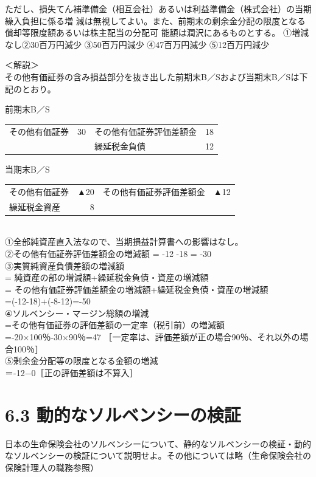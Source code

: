 \documentclass[report,gutter=10mm,fore-edge=10mm,uplatex,dvipdfmx]{jlreq}
\begin{document}
ただし、損失てん補準備金（相互会社）あるいは利益準備金（株式会社）の当期繰入負担に係る増
減は無視してよい。また、前期末の剰余金分配の限度となる償却等限度額あるいは株主配当の分配可
能額は潤沢にあるものとする。
\answer{}
①増減なし②30百万円減少
③50百万円減少
④47百万円減少
⑤12百万円減少

＜解説＞\\
その他有価証券の含み損益部分を抜き出した前期末B／Sおよび当期末B／Sは下記のとおり。

前期末B／S\\
\begin{tabular}{lrlr}
その他有価証券 & 30 & その他有価証券評価差額金&18\\
 & &繰延税金負債&12 \\
\end{tabular}

当期末B／S\\
\begin{tabular}{lrlr}
その他有価証券&▲20&その他有価証券評価差額金&▲12\\
繰延税金資産&8\\
\end{tabular}\\

①全部純資産直入法なので、当期損益計算書への影響はなし。\\
②その他有価証券評価差額金の増減額 = -12 -18 = -30\\
③実質純資産負債差額の増減額\\
=  純資産の部の増減額+繰延税金負債・資産の増減額\\
= その他有価証券評価差額金の増減額+繰延税金負債・資産の増減額\\
=(-12-18)+(-8-12)=-50\\
④ソルベンシー・マージン総額の増減\\
=その他有価証券の評価差額の一定率（税引前）の増減額\\
=-20×100％-30×90％=47 ［一定率は、評価差額が正の場合90％、それ以外の場合100％］\\
⑤剰余金分配等の限度となる金額の増減\\
＝-12−0［正の評価差額は不算入］

\section{6.3 動的なソルベンシーの検証}
日本の生命保険会社のソルベンシーについて、静的なソルベンシーの検証・動的なソルベンシーの検証について説明せよ。その他については略（生命保険会社の保険計理人の職務参照）
\end{document}
